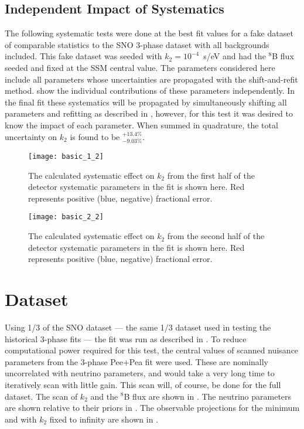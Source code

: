 \clearpage

\subsection{Independent Impact of Systematics}

The following systematic tests were done at the best fit values for a fake dataset of comparable statistics to the SNO 3-phase dataset with all backgrounds included. 
This fake dataset was seeded with $k_2 = 10^{-4}$~s/eV and had the $^8$B flux seeded and fixed at the SSM central value.
The parameters considered here include all parameters whose uncertainties are propagated with the shift-and-refit method. 
 show the individual contributions of these parameters independently.
In the final fit these systematics will be propagated by simultaneously shifting all parameters and refitting as described in , however, for this test it was desired to know the impact of each parameter.
When summed in quadrature, the total uncertainty on $k_2$ is found to be $^{+13.4\%}_{-9.03\%}$.

\begin{figure}
\centering
\texttt{[image: basic\_1\_2]}
\caption{The calculated systematic effect on $k_2$ from the first half of the detector systematic parameters in the fit is shown here. Red represents positive (blue, negative) fractional error.}
\label{fig:detector_systematics1}
\end{figure}

\begin{figure}
\centering
\texttt{[image: basic\_2\_2]}
\caption{The calculated systematic effect on $k_2$ from the second half of the detector systematic parameters in the fit is shown here. Red represents positive (blue, negative) fractional error.}
\label{fig:detector_systematics2}
\end{figure}


\clearpage 

\section{\texorpdfstring{}{1/3} Dataset}
\label{third}

Using 1/3 of the SNO dataset --- the same 1/3 dataset used in testing the historical 3-phase fits --- the fit was run as described in . 
To reduce computational power required for this test, the central values of scanned nuisance parameters from the 3-phase Pee+Pea fit \cite{3phase} were used. 
These are nominally uncorrelated with neutrino parameters, and would take a very long time to iteratively scan with little gain.
This scan will, of course, be done for the full dataset.
The scan of $k_2$ and the $^8$B flux are shown in .
The neutrino parameters are shown relative to their priors in .
The observable projections for the minimum and with $k_2$ fixed to infinity are shown in .

